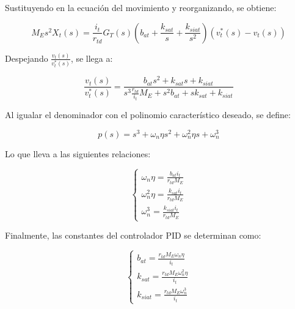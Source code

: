 \documentclass{article}
\begin{document}
            Sustituyendo en la ecuación del movimiento y reorganizando, se obtiene:
            
            \begin{equation}
                M_E s^2 X_t(s) =  \frac{i_t}{r_{td}} G_T(s)\left( b_{at} + \frac{k_{sat}}{s} + \frac{k_{siat}}{s^2} \right)(v_t^*(s) - v_t(s))
            \end{equation}
            
            Despejando $\frac{v_t(s)}{v_t^*(s)}$, se llega a:
            
            \begin{equation}
                \frac{v_t(s)}{v_t^*(s)} = \frac{b_{at} s^2 + k_{sat}s + k_{siat}}{s^3 \frac{r_{td}}{i_t}M_E + s^2 b_{at} + s k_{sat} + k_{siat}}
            \end{equation}
            
            Al igualar el denominador con el polinomio característico deseado, se define:
            
            \begin{equation}\label{(eq:polinomio)}
                p(s) = s^3 + \omega_n \eta s^2 + \omega_n^2 \eta s + \omega_n^3
            \end{equation}
            
            Lo que lleva a las siguientes relaciones:
            
            \begin{equation}
                \begin{cases}
                    \omega_n \eta = \frac{b_{at} i_t}{r_{td}M_E} \\
                    \omega_n^2 \eta = \frac{k_{sat} i_t}{r_{td}M_E} \\
                    \omega_n^3 = \frac{k_{siat} i_t}{r_{td}M_E}
                \end{cases}
            \end{equation}
            
            Finalmente, las constantes del controlador PID se determinan como:
            
            \begin{equation}
                \begin{cases}
                    b_{at} = \frac{r_{td}M_E \omega_n \eta}{i_t} \\
                    k_{sat} = \frac{r_{td}M_E \omega_n^2 \eta}{i_t} \\
                    k_{siat} = \frac{r_{td}M_E \omega_n^3}{i_t}
                \end{cases}
            \end{equation}
            
\end{document}

